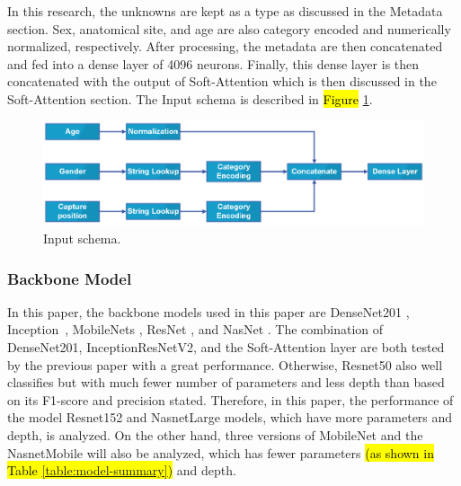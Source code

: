 \documentclass[sensors,article,accept,pdftex,moreauthors]{Definitions/mdpi}
\begin{document}
	In this research, the unknowns are kept as a type as discussed in the Metadata section. Sex, anatomical site, and age are also category encoded and numerically normalized, respectively. After processing, the metadata are then concatenated and fed into a dense layer of 4096 neurons. Finally, this dense layer is then concatenated with the output of Soft-Attention which is then discussed in the Soft-Attention section. The Input schema is described in \hl{Figure} %
 \ref{fig:input-schema}.
	
	\begin{figure}[H]
		\includegraphics[width=1\linewidth]{"Definitions/Input Schema"}
		\caption{Input schema.}
		\label{fig:input-schema}
	\end{figure}
	
	\subsubsection{Backbone Model}
	In this paper, the backbone models used in this paper are DenseNet201 \cite{06993}, Inception~\cite{00567}, MobileNets \cite{04861,04381,02244}, ResNet \cite{03385,05027}, and NasNet \cite{07012}. The combination of DenseNet201, InceptionResNetV2, and the Soft-Attention layer are both tested by the previous paper \cite{03358} with a great performance. Otherwise, Resnet50 also well classifies but with much fewer number of parameters and less depth than based on its F1-score and precision stated. Therefore, in this paper, the performance of the model Resnet152 and NasnetLarge models, which have more parameters and depth, is analyzed. On the other hand, three versions of MobileNet and the NasnetMobile will also be analyzed, which has fewer parameters \hl{(as shown in Table \mbox{\ref{table:model-summary}})} and depth. 
	
\end{document}
